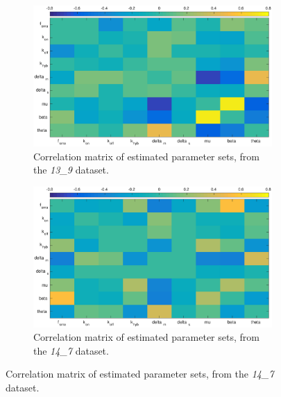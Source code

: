 \documentclass[10pt,journal]{./IEEE_latex_class/IEEEtran}
\begin{document}
\begin{figure}[H]
    \begin{subfigure}[c]{0.49\textwidth}
        \centering
    \includegraphics[scale = 0.24, clip = true, trim = 120 0 70 0]{13_9_heatmap.eps}
        \caption{Correlation matrix of estimated parameter sets, from the  \textit{13\_9} dataset. }
        \label{InitialResults_13_9_correlation}
    \end{subfigure}
    \begin{subfigure}[c]{0.49\textwidth}
    \centering
        \includegraphics[scale = 0.24, clip = true, trim = 80 0 70 0]{14_7_heatmap.eps}
        \caption{Correlation matrix of estimated parameter sets, from the  \textit{14\_7} dataset.}
        \label{InitialResults_14_7_correlation}
    \end{subfigure} 
    

\end{figure}
\end{document}
